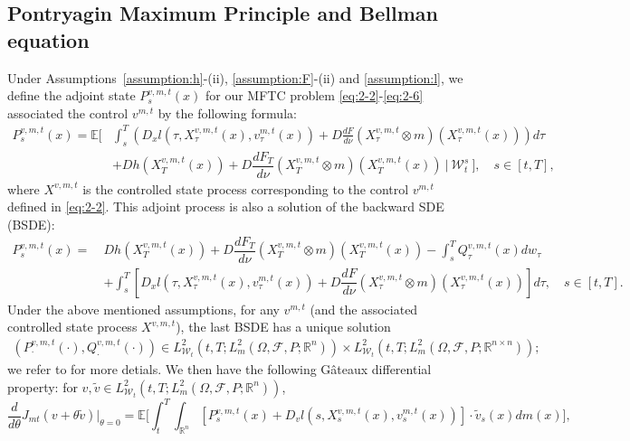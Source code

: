 \documentclass[11pt]{article}
\numberwithin{equation}{section}
\newcommand{\e}{\mathbb{E}}
\newcommand{\br}{\mathbb{R}}
\newcommand{\brn}{{\mathbb{R}^n}}
\newcommand{\1}{\mbox{1\hspace{-1mm}I}}
\begin{document}
\subsection{Pontryagin Maximum Principle and Bellman equation}

Under Assumptions~\ref{assumption:h}-(ii), \ref{assumption:F}-(ii) and \ref{assumption:l}, we define the adjoint state $P^{v,m,t}_s(x)$ for our MFTC problem \eqref{eq:2-2}-\eqref{eq:2-6} associated the control $v^{m,t}$ by the following formula:
\begin{align*}
    P^{v,m,t}_s(x)=\e \bigg[&\int_{s}^{T}\left(D_{x} l\left(\tau,X^{v,m,t}_\tau(x),v^{m,t}_\tau(x) \right)+D\frac{dF}{d\nu}\left(X^{v,m,t}_\tau\otimes m\right)\left(X^{v,m,t}_\tau(x)\right)\right)d\tau\\
    &+Dh\left(X^{v,m,t}_T(x)\right)+D\dfrac{dF_{T}}{d\nu}\left(X^{v,m,t}_T\otimes m\right)\left(X^{v,m,t}_T(x)\right)\ \bigg|\ \mathcal{W}_{t}^{s}\ \bigg],\quad s\in[t,T],
\end{align*}
where $X^{v,m,t}$ is the controlled state process corresponding to the control $v^{m,t}$ defined in \eqref{eq:2-2}. This adjoint process is also a solution of the backward SDE (BSDE):
\begin{align*}
    P^{v,m,t}_s(x)=\ & Dh\left(X^{v,m,t}_T(x)\right)+D\dfrac{dF_{T}}{d\nu}\left(X^{v,m,t}_T\otimes m\right)\left(X^{v,m,t}_T(x)\right) - \int_s^T Q^{v,m,t}_\tau (x) dw_\tau\\
    &+ \int_s^T \left[D_{x}l\left(\tau,X^{v,m,t}_\tau(x),v^{m,t}_\tau(x)\right)+D\dfrac{dF}{d\nu}\left(X^{v,m,t}_\tau\otimes m\right)\left(X^{v,m,t}_\tau(x)\right)\right]d\tau,\quad s\in[t,T].
\end{align*}
Under the above mentioned assumptions, for any $v^{m,t}$ (and the associated controlled state process $X^{v,m,t}$), the last BSDE has a unique solution 
\begin{align*}
    \left(P^{v,m,t}_\cdot(\cdot),Q^{v,m,t}_\cdot(\cdot)\right)\in L_{\mathcal{W}_{t}}^{2}\left(t,T;L_{m}^{2}(\Omega,\mathcal{F},P;\brn)\right)\times L_{\mathcal{W}_{t}}^{2}\left(t,T;L_{m}^{2}(\Omega,\mathcal{F},P;\br^{n\times n})\right);
\end{align*}
we refer to \cite{AB8} for more detials. We then have the following G\^ateaux differential property: for $v,\widetilde{v}\in L_{\mathcal{W}_{t}}^{2}\left(t,T;L_{m}^{2}(\Omega,\mathcal{F},P;\brn)\right)$,
\begin{equation}
    \frac{d}{d\theta}J_{mt}\left(v+\theta\widetilde{v}\right)\bigg|_{\theta=0}=\e\bigg[\int_{t}^{T}\int_{\brn}\left[P^{v,m,t}_s(x)+D_{v}l\left(s,X^{v,m,t}_s(x),v^{m,t}_s(x)\right)\right]\cdot \widetilde{v}_s(x)dm(x)\bigg],
\end{equation}
\end{document}
